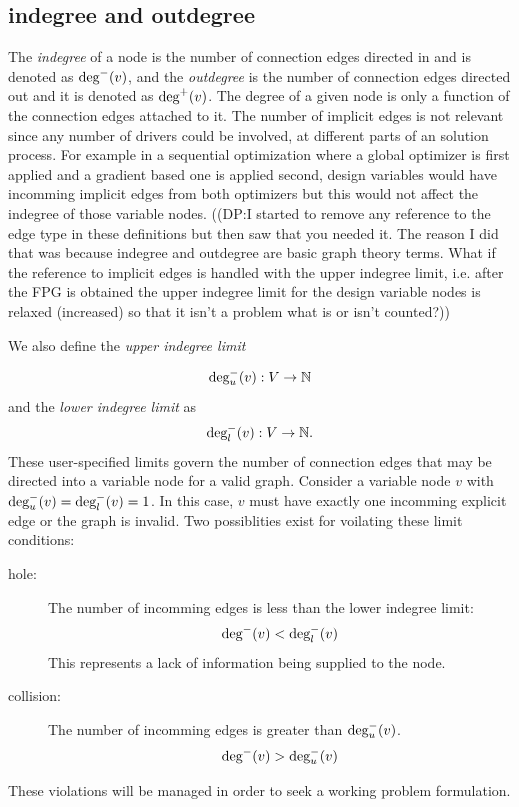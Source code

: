 \subsection{indegree and outdegree}
	\label{s:indegree-outdegree}
	The \emph{indegree} of a node is the number of connection edges directed in and 
	is denoted as $\textrm{deg}^-(v)$, and the \emph{outdegree} 
	is the number of connection edges directed out and it is denoted as $\textrm{deg}^+(v)$.
	The degree of a given node is only a function of the connection edges 
	attached to it. The number of implicit edges is not relevant since any number 
	of drivers could be involved, at different parts of an solution process. For 
	example in a sequential optimization where a global optimizer is first applied
	and a gradient based one is applied second, design variables would have incomming 
	implicit edges from both optimizers but this would not affect the indegree of those
	variable nodes. 
	((DP:I started to remove any reference to the edge type in these definitions but then saw that you needed it. The reason I did that was because indegree and outdegree are basic graph theory terms. What if the reference to implicit edges is handled with the upper indegree limit, i.e. after the FPG is obtained the upper indegree limit for the design variable nodes is relaxed (increased) so that it isn't a problem what is or isn't counted?))

	We also define the \emph{upper indegree limit} 

	\begin{equation}
	\textrm{deg}_u^-(v):V \to \mathbb{N}
	\end{equation} 
	and the \emph{lower indegree limit} as
	\begin{equation}
	\textrm{deg}_l^-(v):V \to \mathbb{N}.
	\end{equation}
	These user-specified limits govern the number of connection edges that may be directed into a variable
	node for a valid graph. Consider a variable node $v$ with
	$\textrm{deg}_u^-(v) = \textrm{deg}_l^-(v) = 1$. In this case, $v$ must have exactly one
	incomming explicit edge or the graph is invalid. Two possiblities exist for voilating 
	these limit conditions: 
	\begin{description}
	  \item[hole: ] The number of incomming edges is less than the lower indegree limit:
		\begin{equation} \textrm{deg}^-(v) < \textrm{deg}_l^-(v) \label{e:hole} \end{equation}
		This represents a lack of information being supplied to the node.

  \item[collision: ] The number of incomming edges is greater than $ \textrm{deg}_u^-(v)$. 
    \begin{equation} \textrm{deg}^-(v) > \textrm{deg}_u^-(v) \label{e:collision}\end{equation}
\end{description} 
These violations will be managed in order to seek a working problem formulation.

